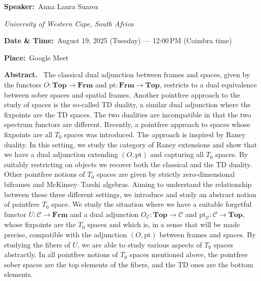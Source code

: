 \documentclass[11pt,a4paper]{article}
\newcommand{\Field}[2]{\textbf{#1:}~#2\par}
\newcommand{\Affil}[1]{\textit{#1}\par}
\newcommand{\Abstract}{\vspace{0.6em}\textbf{Abstract.}~}
\begin{document}
\Field{Speaker}{Anna Laura Suarez}
\Affil{University of Western Cape, South Africa}

\Field{Date \& Time}{August 19, 2025 (Tuesday) — 12{:}00\,PM (Coimbra time)}
\Field{Place}{Google Meet}

\Abstract
The classical dual adjunction between frames and spaces, given by the functors
$O\colon \mathbf{Top} \to \mathbf{Frm}$ and $\mathrm{pt}\colon \mathbf{Frm} \to \mathbf{Top}$, restricts to a dual equivalence between sober spaces
and spatial frames. Another pointfree approach to the study of spaces is the so-called TD
duality, a similar dual adjunction where the fixpoints are the TD spaces. The two dualities are
incompatible in that the two spectrum functors are different. Recently, a pointfree approach
to spaces whose fixpoints are all $T_0$ spaces was introduced. The approach is inspired by Raney
duality. In this setting, we study the category of Raney extensions and show that we have a dual
adjunction extending $(O,\mathrm{pt})$ and capturing all $T_0$ spaces. By suitably restricting on objects we
recover both the classical and the TD duality. Other pointfree notions of $T_0$ spaces are given
by strictly zero-dimensional biframes and McKinsey--Tarski algebras. Aiming to understand
the relationship between these three different settings, we introduce and study an abstract
notion of pointfree $T_0$ space. We study the situation where we have a suitable forgetful functor
$U \colon \mathcal{C} \to \mathbf{Frm}$ and a dual adjunction $O_{\mathcal C}\colon \mathbf{Top} \to \mathcal C$ and $\mathrm{pt}_{\mathcal C}\colon \mathcal C \to \mathbf{Top}$, whose fixpoints are the
$T_0$ spaces and which is, in a sense that will be made precise, compatible with the adjunction
$(O,\mathrm{pt})$ between frames and spaces. By studying the fibers of $U$, we are able to study various
aspects of $T_0$ spaces abstractly. In all pointfree notions of $T_0$ spaces mentioned above, the
pointfree sober spaces are the top elements of the fibers, and the TD ones are the bottom
elements.
\end{document}
